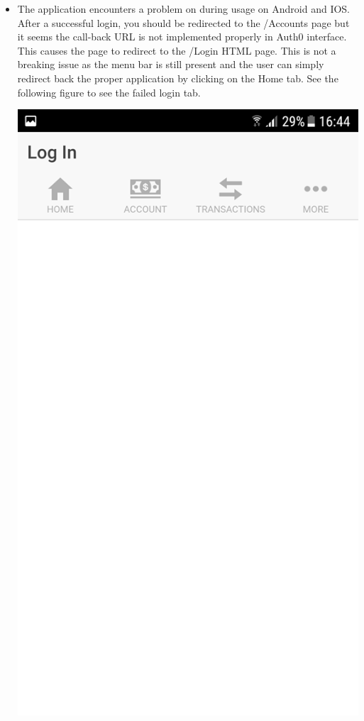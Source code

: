 \begin{itemize}
    \item The application encounters a problem on during usage on Android and IOS. After a successful login, you should be redirected to the /Accounts page but it seems the call-back URL is not implemented properly in Auth0 interface. This causes the page to redirect to the /Login HTML page. This is not a breaking issue as the menu bar is still present and the user can simply redirect back the proper application by clicking on the Home tab.
    See the following figure to see the failed login tab.
    \begin{center}    
      \includegraphics[scale=0.25]{img/4logingonewrong.png}

\end{center}
\end{itemize}
